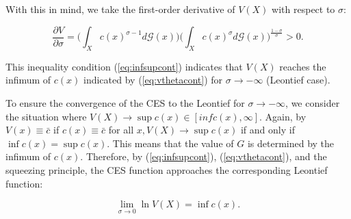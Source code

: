 With this in mind, we take the first-order derivative of $V(X)$ with respect to $\sigma$:

\begin{equation}\label{eq:vthetacont}
\frac{\partial V}{\partial \sigma} = \bigg(\int_X c(x)^{\sigma -1} d\mathcal{G}(x)\bigg)\bigg(\int_X c(x)^{\sigma} d\mathcal{G}(x)\bigg)^{\frac{1 - \sigma}{\sigma}} > 0.
\end{equation}

This inequality condition (\ref{eq:infsupcont}) indicates that $V(X)$ reaches the infimum of $c(x)$ indicated by (\ref{eq:vthetacont}) for $\sigma \rightarrow -\infty$ (Leontief case).

To ensure the convergence of the CES to the Leontief for $\sigma \rightarrow -\infty$, we consider the situation where $V(X) \rightarrow \sup c(x) \in [inf c(x), \infty]$. Again, by $V(x) \equiv \bar{c}$ if $c(x) \equiv \bar{c}$ for all $x, V(X) \rightarrow \sup c(x)$ if and only if $\inf c(x) = \sup c(x)$. This means that the value of $G$ is determined by the infimum of $c(x)$. Therefore, by (\ref{eq:infsupcont}), (\ref{eq:vthetacont}), and the squeezing principle, the CES function approaches the corresponding Leontief function:

\begin{equation}
\lim\limits_{\sigma \rightarrow 0}\ln V(X) = \inf c(x).
\end{equation}